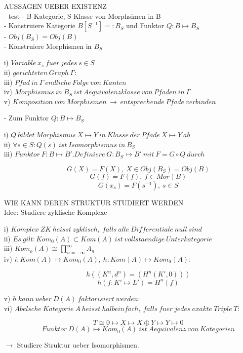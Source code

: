 \documentclass[12pt]{article}
\begin{document}
AUSSAGEN UEBER EXISTENZ \\
\newline
- test
- B Kategorie, S Klasse von Morphsimen in B \\
- Konstruiere Kategorie $B[S^{-1}] =: B_S$ und Funktor $Q : B \mapsto B_S$ \\
\newline
- $Obj(B_S) = Obj(B)$\\
- Konstruiere Morphismen in $B_S$
\begin{description}
    \item[i) $Variable \: x_s \: fuer \: jedes \: s \in S$]
    \item[ii) $gerichteten \: Graph \: \Gamma$:]
    \item[iii) $Pfad \: in \: \Gamma \: endliche \: Folge \: von \: Kanten$]
    \item[iv) $Morphismus \: in \: B_S \: ist \: Aequivalenzklasse \: von \: Pfaden \: in \: \Gamma$]
    \item[v) $Komposition \: von \: Morphismen \: \rightarrow \: entsprechende \: Pfade \: verbinden $]
\end{description}
- Zum Funktor $Q : B \mapsto B_S$
\begin{description}
    \item[i) $Q \: bildet \: Morphismus \: X \mapsto Y \: in \: Klasse \: der \: Pfade \: X \mapsto Y \: ab$]
    \item[ii) $\forall s \in S : Q(s) \: ist \: Isomorphismus \: in \: B_S$]
    \item[iii) $Funktor \: F : B \mapsto B'. Definiere \: G : B_S \mapsto B' \: mit \: F = G \circ Q \: durch$]
        \[G(X) = F(X), \: X \in Obj(B_S) = Obj(B)\]
        \[G(f) = F(f), \: f \in Mor(B)\]
        \[G(x_s) = F(s^{-1}), \: s \in S\]
\end{description}
WIE KANN DEREN STRUKTUR STUDIERT WERDEN\\

{\large Idee: Studiere zyklische Komplexe}
\begin{description}
    \item[i) $Komplex \: ZK \: heisst \: zyklisch, \: falls \: alle \: Differentiale \: null \: sind$]
    \item[ii) $Es \: gilt: Kom_0(A) \subset Kom(A) \: ist \: vollstaendige \: Unterkategorie$]  
    \item[iii) $Kom_o(A) \cong \prod_{n=-\infty}^\infty A_n$]
    \item[iv) $i : Kom(A) \mapsto Kom_0(A), \: h : Kom(A) \mapsto Kom_0(A)$:]
        \[h((K^n,d^n) = (H^n(K',0)))\]
        \[h(f:K' \mapsto L') = H^n(f)\]
    \item[v) $h \: kann  \: ueber \: D(A) \: faktorisiert \: werden$:]
    \item[vi) $Abelsche \: Kategorie \: A \: heisst \: halbeinfach, \: falls \: fuer \: jedes \: exakte \: Triple \: T$:]
        \[T \cong 0 \mapsto X \mapsto X \oplus Y \mapsto Y \mapsto 0\]
        \[Funktor \: D(A) \mapsto Kom_0(A) \: ist \: Aequivalenz \: von \: Kategorien\]
\end{description}
$\rightarrow$ Studiere Struktur ueber Isomorphismen.
\end{document}

